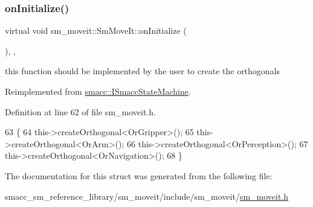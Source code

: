 \subsubsection{\texorpdfstring{on\+Initialize()}{onInitialize()}}
{\footnotesize\ttfamily virtual void sm\+\_\+moveit\+::\+Sm\+Move\+It\+::on\+Initialize (\begin{DoxyParamCaption}{ }\end{DoxyParamCaption})\hspace{0.3cm}{\ttfamily [inline]}, {\ttfamily [override]}, {\ttfamily [virtual]}}



this function should be implemented by the user to create the orthogonals 



Reimplemented from \hyperlink{classsmacc_1_1ISmaccStateMachine_ac2982c6c8283663e5e1e8a7c82f511ec}{smacc\+::\+I\+Smacc\+State\+Machine}.



Definition at line 62 of file sm\+\_\+moveit.\+h.


\begin{DoxyCode}
63     \{
64         this->createOrthogonal<OrGripper>();
65         this->createOrthogonal<OrArm>();
66         this->createOrthogonal<OrPerception>();
67         this->createOrthogonal<OrNavigation>();
68     \}
\end{DoxyCode}


The documentation for this struct was generated from the following file\+:\begin{DoxyCompactItemize}
\item 
smacc\+\_\+sm\+\_\+reference\+\_\+library/sm\+\_\+moveit/include/sm\+\_\+moveit/\hyperlink{sm__moveit_8h}{sm\+\_\+moveit.\+h}\end{DoxyCompactItemize}
